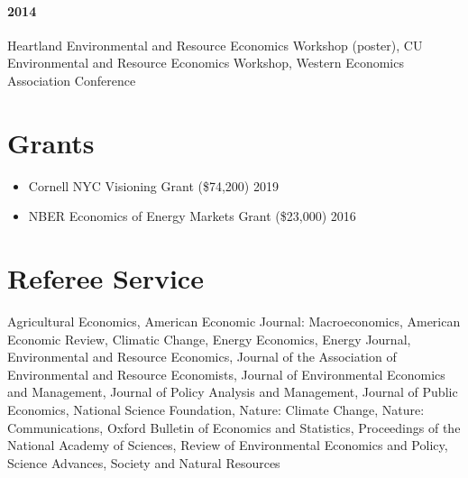 \documentclass{res} %
\begin{document}
\begin{resume}
\paragraph{2014} Heartland Environmental and Resource Economics Workshop (poster), CU Environmental and Resource Economics Workshop, Western Economics Association Conference

\vspace{-.075in}
\section{Grants}
	\begin{itemize}  \itemsep -1pt
		\item[] Cornell NYC Visioning Grant (\$74,200) \hfill 2019
		\item[] NBER Economics of Energy Markets Grant (\$23,000) \hfill 2016
	\end{itemize}
\vspace{-.075in}
\section{Referee Service}
	Agricultural Economics, American Economic Journal: Macroeconomics, American Economic Review, Climatic Change, Energy Economics, Energy Journal, Environmental and Resource Economics, Journal of the Association of Environmental and Resource Economists, Journal of Environmental Economics and Management, Journal of Policy Analysis and Management, Journal of Public Economics, National Science Foundation, Nature: Climate Change, Nature: Communications, Oxford Bulletin of Economics and Statistics, Proceedings of the National Academy of Sciences, Review of Environmental Economics and Policy, Science Advances, Society and Natural Resources

\vspace{-.075in}


\end{resume}
\end{document}
